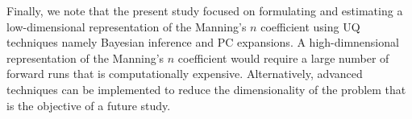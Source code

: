 Finally, we note that the present study focused on formulating and estimating a low-dimensional representation
of the Manning's $n$ coefficient using UQ techniques namely Bayesian inference and PC expansions.  A high-dimnensional representation of the Manning's $n$ coefficient would require a large number of forward runs that is computationally expensive. Alternatively, advanced techniques can be implemented to reduce the dimensionality of the problem 
that is the objective of a future study.